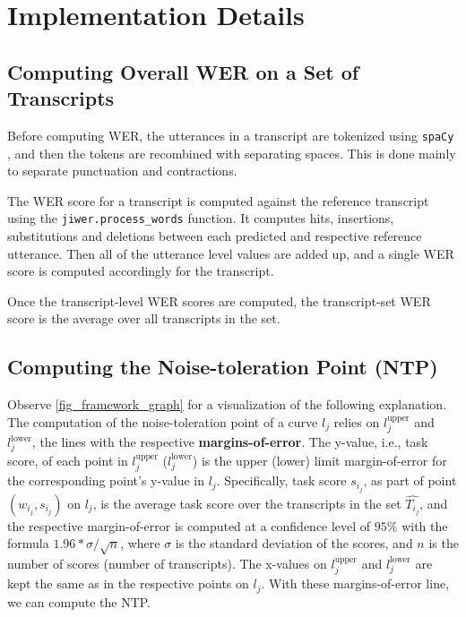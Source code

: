\appendix

\section{Implementation Details}
\label{sec_appendix_implementation}

\subsection{Computing Overall WER on a Set of Transcripts}
\label{sec_appendix_implementation_wer}

Before computing WER, the utterances in a transcript are tokenized using \texttt{spaCy} \citep{spacy2017}, and then the tokens are recombined with separating spaces. This is done mainly to separate punctuation and contractions.

The WER score for a transcript is computed against the reference transcript using the \texttt{jiwer.process\_words} function. It computes hits, insertions, substitutions and deletions between each predicted and respective reference utterance. Then all of the utterance level values are added up, and a single WER score is computed accordingly for the transcript.

Once the transcript-level WER scores are computed, the transcript-set WER score is the average over all transcripts in the set.


\subsection{Computing the Noise-toleration Point (NTP)}
\label{sec_appendix_implementation_ntp}

Observe \autoref{fig_framework_graph} for a visualization of the following explanation.
The computation of the noise-toleration point of a curve $l_j$ relies on $l_j^{\text{upper}}$ and $l_j^{\text{lower}}$, the lines with the respective \textbf{margins-of-error}. The y-value, i.e., task score, of each point in $l_j^{\text{upper}}$ ($l_j^{\text{lower}}$) is the upper (lower) limit margin-of-error for the corresponding point's y-value in $l_j$. Specifically, task score $s_{i_j}$, as part of point $(w_{i_j}, s_{i_j})$ on $l_j$, is the average task score over the transcripts in the set $\widehat{T_{i_j}}$, and the respective margin-of-error is computed at a confidence level of $95\%$ with the formula $1.96*\sigma/\sqrt{n}$, where $\sigma$ is the standard deviation of the scores, and $n$ is the number of scores (number of transcripts). The x-values on $l_j^{\text{upper}}$ and $l_j^{\text{lower}}$ are kept the same as in the respective points on $l_j$. With these margins-of-error line, we can compute the NTP.

